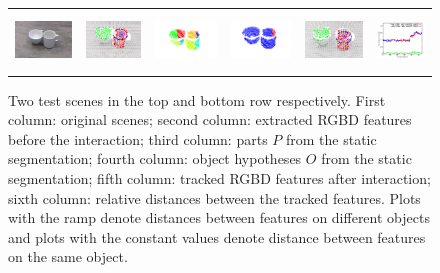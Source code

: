 \begin{figure}[t!]
\begin{centering}
\begin{tabular}{p{}p{}p{}p{}p{}p{}}
    \includegraphics[height=1.5cm]{figures/scene2/image_before1.jpg}
&    \includegraphics[height=1.5cm]{figures/scene2/pcl_before1.png}
&    \includegraphics[height=1.5cm]{figures/scene2/segments1.png}    
&    \includegraphics[height=1.5cm]{figures/scene2/labels1.png}
&    \includegraphics[height=1.5cm]{figures/scene2/pcl_after1.png}  
&    \includegraphics[height=1.5cm]{figures/scene2/distances.png}

  \end{tabular}
		\vspace{-2ex}
    \caption{Two test scenes in the top and bottom row respectively. First column:
      original scenes; second column: extracted RGBD features before the
      interaction; third column: parts $P$ from the static segmentation;
      fourth column: object hypotheses $O$ from the static segmentation; fifth column:
      tracked RGBD features after interaction; sixth column: relative
      distances between the tracked features. Plots with the ramp denote distances between features on different objects 
      and plots with the constant values denote distance between features on the same object.}
    \label{fig:scenes}
  \end{centering}
\end{figure}







